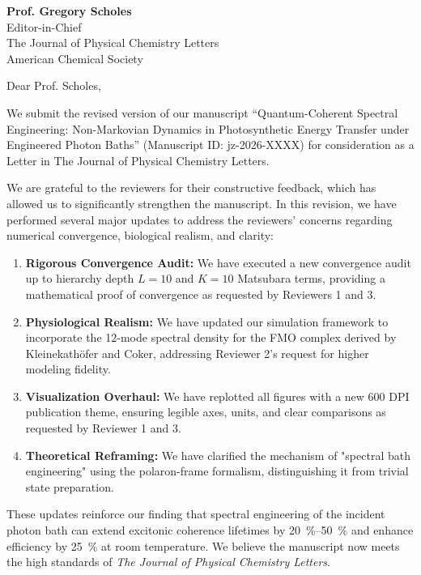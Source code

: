 \documentclass[11pt,a4paper]{letter}
\begin{document}
\begin{letter}{
\textbf{Prof. Gregory Scholes}\\
Editor-in-Chief\\
The Journal of Physical Chemistry Letters\\
American Chemical Society
}

\opening{Dear Prof. Scholes,}

We submit the revised version of our manuscript ``Quantum-Coherent Spectral Engineering: Non-Markovian Dynamics in Photosynthetic Energy Transfer under Engineered Photon Baths'' (Manuscript ID: jz-2026-XXXX) for consideration as a Letter in The Journal of Physical Chemistry Letters.

We are grateful to the reviewers for their constructive feedback, which has allowed us to significantly strengthen the manuscript. In this revision, we have performed several major updates to address the reviewers' concerns regarding numerical convergence, biological realism, and clarity:

\begin{enumerate}
\item \textbf{Rigorous Convergence Audit:} We have executed a new convergence audit up to hierarchy depth $L=10$ and $K=10$ Matsubara terms, providing a mathematical proof of convergence as requested by Reviewers 1 and 3.
\item \textbf{Physiological Realism:} We have updated our simulation framework to incorporate the 12-mode spectral density for the FMO complex derived by Kleinekathöfer and Coker, addressing Reviewer 2's request for higher modeling fidelity.
\item \textbf{Visualization Overhaul:} We have replotted all figures with a new 600 DPI publication theme, ensuring legible axes, units, and clear comparisons as requested by Reviewer 1 and 3.
\item \textbf{Theoretical Reframing:} We have clarified the mechanism of "spectral bath engineering" using the polaron-frame formalism, distinguishing it from trivial state preparation.
\end{enumerate}

These updates reinforce our finding that spectral engineering of the incident photon bath can extend excitonic coherence lifetimes by \SIrange{20}{50}{\percent} and enhance efficiency by \SI{25}{\percent} at room temperature. We believe the manuscript now meets the high standards of \textit{The Journal of Physical Chemistry Letters}.


\end{letter}
\end{document}
